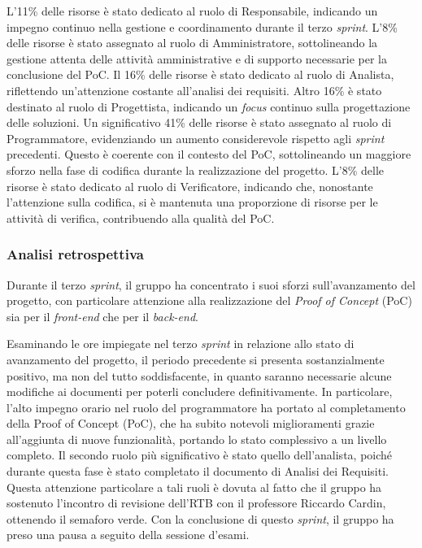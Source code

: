 L'11\% delle risorse è stato dedicato al ruolo di Responsabile, indicando un impegno continuo nella gestione e coordinamento durante il terzo \textit{sprint}.
L'8\% delle risorse è stato assegnato al ruolo di Amministratore, sottolineando la gestione attenta delle attività amministrative e di supporto necessarie per la conclusione del PoC.
Il 16\% delle risorse è stato dedicato al ruolo di Analista, riflettendo un'attenzione costante all'analisi dei requisiti.
Altro 16\% è stato destinato al ruolo di Progettista, indicando un \textit{focus} continuo sulla progettazione delle soluzioni.
Un significativo 41\% delle risorse è stato assegnato al ruolo di Programmatore, evidenziando un aumento considerevole rispetto agli \textit{sprint} precedenti. 
Questo è coerente con il contesto del PoC, sottolineando un maggiore sforzo nella fase di codifica durante la realizzazione del progetto.
L'8\% delle risorse è stato dedicato al ruolo di Verificatore, indicando che, nonostante l'attenzione sulla codifica, si è mantenuta una proporzione di risorse per le attività di verifica, contribuendo alla qualità del PoC.

\subsubsection{Analisi retrospettiva}

Durante il terzo \textit{sprint}, il gruppo ha concentrato i suoi sforzi sull'avanzamento del progetto, con particolare attenzione alla realizzazione del \textit{Proof of Concept} 
(PoC) sia per il \textit{front-end} che per il \textit{back-end}.

Esaminando le ore impiegate nel terzo \textit{sprint} in relazione allo stato di avanzamento del progetto, il periodo precedente si presenta sostanzialmente positivo, ma 
non del tutto soddisfacente, in quanto saranno necessarie alcune modifiche ai documenti per poterli concludere definitivamente. In particolare, l'alto impegno 
orario nel ruolo del programmatore ha portato al completamento della Proof of Concept (PoC), che ha subito notevoli miglioramenti grazie all'aggiunta di nuove funzionalità, portando lo stato 
complessivo a un livello completo. Il secondo ruolo più significativo è stato quello dell'analista, poiché durante questa fase è stato completato il documento di Analisi dei Requisiti.
Questa attenzione particolare a tali ruoli è dovuta al fatto che il gruppo ha sostenuto l'incontro di revisione dell'RTB con il professore Riccardo Cardin, ottenendo il semaforo verde.
Con la conclusione di questo \textit{sprint}, il gruppo ha preso una pausa a seguito della sessione d'esami.

